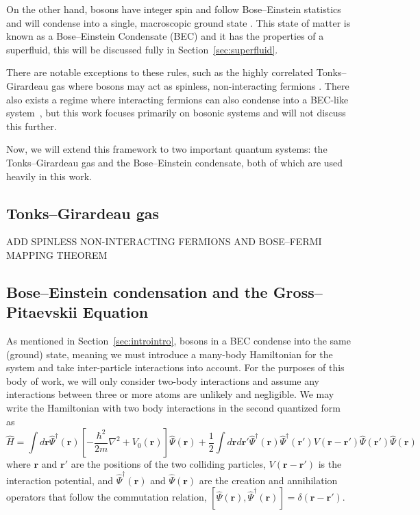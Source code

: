 On the other hand, bosons have integer spin and follow Bose--Einstein statistics and will condense into a single, macroscopic ground state \cite{Einstein1925, Fetter2003}.
This state of matter is known as a Bose--Einstein Condensate (BEC) and it has the properties of a superfluid, this will be discussed fully in Section~\ref{sec:superfluid}.

There are notable exceptions to these rules, such as the highly correlated Tonks--Girardeau gas where bosons may act as spinless, non-interacting fermions \cite{Girardeau}.
There also exists a regime where interacting fermions can also condense into a BEC-like system~\cite{Nozieres1985, Bulgac2014}, but this work focuses primarily on bosonic systems and will not discuss this further.

Now, we will extend this framework to two important quantum systems: the Tonks--Girardeau gas and the Bose--Einstein condensate, both of which are used heavily in this work.

\subsection{Tonks--Girardeau gas}

ADD SPINLESS NON-INTERACTING FERMIONS AND BOSE--FERMI MAPPING THEOREM

\subsection{Bose--Einstein condensation and the Gross--Pitaevskii Equation}

As mentioned in Section~\ref{sec:introintro}, bosons in a BEC condense into the same (ground) state, meaning we must introduce a many-body Hamiltonian for the system and take inter-particle interactions into account.
For the purposes of this body of work, we will only consider two-body interactions and assume any interactions between three or more atoms are unlikely and negligible.
We may write the Hamiltonian with two body interactions in the second quantized form as
\begin{equation}
    \hat H = \int d\mathbf{r} \hat \Psi^\dagger(\mathbf{r})\left[-\frac{\hbar^2}{2m}\nabla^2 + V_0(\mathbf{r}) \right]\hat \Psi(\mathbf{r}) + \frac{1}{2} \int d\mathbf{r} d\mathbf{r'} \hat \Psi^\dagger(\mathbf{r}) \hat \Psi^\dagger(\mathbf{r'}) V(\mathbf{r} - \mathbf{r'})\hat \Psi(\mathbf{r'}) \hat \Psi(\mathbf{r})
    \label{eqn:2nd}
\end{equation}
where $\mathbf{r}$ and $\mathbf{r'}$ are the positions of the two colliding particles, $V(\mathbf{r}-\mathbf{r'})$ is the interaction potential, and $\hat \Psi^\dagger(\mathbf{r})$ and $\hat \Psi(\mathbf{r})$ are the creation and annihilation operators that follow the commutation relation, $[\hat \Psi(\mathbf{r}),\hat \Psi^\dagger(\mathbf{r})] = \delta(\mathbf{r} - \mathbf{r'})$.

